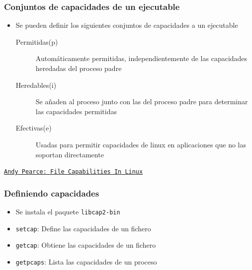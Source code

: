 \documentclass[aspectratio=169]{beamer}
\begin{document}
\begin{frame}
  \frametitle{Conjuntos de capacidades de un ejecutable}
  \begin{itemize}
  \item Se pueden definir los siguientes conjuntos de capacidades a un
    ejecutable
    \begin{description}
    \item[Permitidas(p)] Automáticamente permitidas, independientemente
      de las capacidades heredadas del proceso padre 
    \item[Heredables(i)] Se añaden al proceso junto con las del proceso
      padre para determinar las capacidades permitidas
    \item[Efectivas(e)] Usadas para permitir capacidades de linux en
      aplicaciones que no las soportan directamente
    \end{description}
  \end{itemize}
  \footnotesize{\texttt{\href{http://www.andy-pearce.com/blog/posts/2013/Mar/file-capabilities-in-linux/}{Andy Pearce: File Capabilities In Linux}}}
\end{frame}

\begin{frame}
  \frametitle{Definiendo capacidades}
  \begin{itemize}
  \item Se instala el paquete \texttt{libcap2-bin}
  \item \texttt{setcap}: Define las capacidades de un fichero
  \item \texttt{getcap}: Obtiene las capacidades de un fichero
  \item \texttt{getpcaps}: Lista las capacidades de un proceso
  \end{itemize}
\end{frame}
\end{document}
